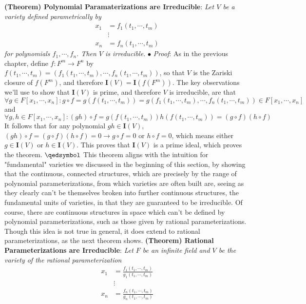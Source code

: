 \documentclass{article}
\newcommand*{\tb}{\textbf}
\newcommand*{\ti}{\textit}
\newcommand*{\n}{\newline}
\newcommand*{\nn}{\newline \newline}
\newcommand*{\Pf}{\indent \ensuremath{\bullet} \textit{Proof}: }
\newcommand*{\Fx}{\ensuremath{F[x_1, \cdots, x_n]}}
\newcommand*{\I}{\ensuremath{\mathbf{I}}}
\newcommand*{\IV}{\ensuremath{\mathbf{I}(V)}}
\begin{document}
\nn
\tb{(Theorem) Polynomial Paramaterizations are Irreducible}: \ti{Let $ V $ be a variety defined parametrically by}
$$ \begin{aligned}
    x_1 &= f_1(t_1, \cdots, t_m) \\
    &\vdots \\
    x_n &= f_n(t_1, \cdots, t_m)
\end{aligned} $$
\indent \ti{for polynomials $ f_1, \cdots, f_n $. Then $ V $ is irreducible.}
\n
\Pf As in the previous chapter, define $ f: F^m \rightarrow F^n $ by $ f(t_1, \cdots, t_m) = (f_1(t_1, \cdots, t_m), \cdots, f_n(t_1, \cdots, t_m)) $, so that $ V $ is the Zariski closure of $ f(F^m) $, and therefore $ \IV = \I(f(F^m)) $. The key observations we'll use to show that $ \IV $ is prime, and therefore $ V $ is irreducible, are that
$$ \forall g \in \Fx: g \circ f = g(f(t_1, \cdots, t_m)) = g(f_1(t_1, \cdots, t_m), \cdots, f_n(t_1, \cdots, t_m)) \in \Fx $$
and
$$ \forall g, h \in \Fx: (g h) \circ f = g(f(t_1, \cdots, t_m)) h(f(t_1, \cdots, t_m)) = (g \circ f) (h \circ f) $$
It follows that for any polynomial $ g h \in \IV $, $ (g h) \circ f = (g \circ f) (h \circ f) = 0 \rightarrow g \circ f = 0 \text{ or } h \circ f = 0 $, which means either $ g \in \IV $ or $ h \in \IV $. This proves that $ \IV $ is a prime ideal, which proves the theorem. $ \qedsymbol $
\nn
This theorem aligns with the intuition for "fundamental" varieties we discussed in the beginning of this section, by showing that the continuous, connected structures, which are precisely by the range of polynomial parameterizations, from which varieties are often built are, seeing as they clearly can't be themselves broken into further continuous structures, the fundamental units of varieties, in that they are guaranteed to be irreducible. Of course, there are continuous structures in space which can't be defined by polynomial parameterizations, such as those given by rational parameterizations. Though this idea is not true in general, it does extend to rational parameterizations, as the next theorem shows.
\nn
\tb{(Theorem) Rational Parameterizations are Irreducible}: \ti{Let $ F $ be an infinite field and $ V $ be the variety of the rational parameterization}
$$ \begin{aligned}
    x_1 &= \frac{f_1(t_1, \cdots, t_m)}{g_1(t_1, \cdots, t_m)} \\
    &\vdots \\
    x_n &= \frac{f_n(t_1, \cdots, t_m)}{g_n(t_1, \cdots, t_m)} \\
\end{aligned} $$
\end{document}

